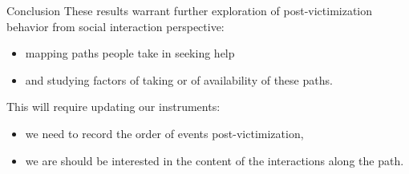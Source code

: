 \documentclass{beamer}
\begin{document}
	\begin{frame}{Conclusion}
		These results warrant further exploration of post-victimization behavior from social interaction perspective:
		\begin{itemize}
			\item mapping paths people take in seeking help
			\item and studying factors of taking or of availability of these paths. 
		\end{itemize}
		
		This will require updating our instruments:
		\begin{itemize}
			\item we need to record the order of events post-victimization,
			\item we are should be interested in the content of the interactions along the path.
		\end{itemize} 

	\end{frame}
	
	



	\printbibliography %
\end{document}
